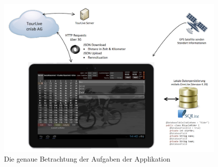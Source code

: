 \begin{figure}[h!]
\caption{Die genaue Betrachtung der Aufgaben der Applikation}
\label{fig:closepicture}
\centering
\includegraphics[scale=0.8]{05bericht/images/closepicture.png}
\end{figure}
